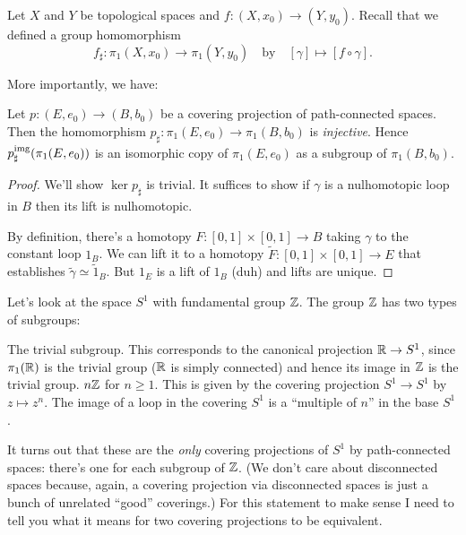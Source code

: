 Let $X$ and $Y$ be topological spaces and $f \colon (X, x_0) \to (Y, y_0)$.
Recall that we defined a group homomorphism
\[ f_\sharp \colon \pi_1(X, x_0) \to \pi_1(Y, y_0)
	\quad\text{by}\quad
	[\gamma] \mapsto [f \circ \gamma]. \]

More importantly, we have:
\begin{proposition}
	Let $p \colon (E,e_0) \to (B,b_0)$ be a covering projection of path-connected spaces.
	Then the homomorphism $p_\sharp \colon \pi_1(E, e_0) \to \pi_1(B, b_0)$ is \emph{injective}.
	Hence $p_\sharp ^{\text{img}}(\pi_1(E, e_0))$ is an isomorphic copy of $\pi_1(E, e_0)$
	as a subgroup of $\pi_1(B, b_0)$.
\end{proposition}
\begin{proof}
	We'll show $\ker p_\sharp$ is trivial.
	It suffices to show if $\gamma$ is a nulhomotopic loop in $B$
	then its lift is nulhomotopic.

	By definition, there's a homotopy $F \colon [0,1] \times [0,1] \to B$
	taking $\gamma$ to the constant loop $1_B$.
	We can lift it to a homotopy $\tilde F \colon [0,1] \times [0,1] \to E$
	that establishes $\tilde\gamma \simeq \tilde 1_B$.
	But $1_E$ is a lift of $1_B$ (duh) and lifts are unique.
\end{proof}

\begin{example}[Subgroups of $\ZZ$]
	Let's look at the space $S^1$ with fundamental group $\ZZ$.
	The group $\ZZ$ has two types of subgroups:
	\begin{itemize}
		\ii The trivial subgroup.
		This corresponds to the canonical projection $\mathbb R \to S^1$,
		since $\pi_1(\mathbb R)$ is the trivial group ($\mathbb R$ is simply connected)
		and hence its image in $\ZZ$ is the trivial group.
		\ii $n\mathbb Z$ for $n \ge 1$.
		This is given by the covering projection $S^1 \to S^1$
		by $z \mapsto z^n$.
		The image of a loop in the covering $S^1$ is a ``multiple of $n$''
		in the base $S^1$.
	\end{itemize}
\end{example}

It turns out that these are the \emph{only} covering projections of $S^1$ by path-connected spaces: there's one for each subgroup of $\ZZ$.
(We don't care about disconnected spaces because, again, a covering projection
via disconnected spaces is just a bunch of unrelated ``good'' coverings.)
For this statement to make sense I need to tell you what it means for
two covering projections to be equivalent.

